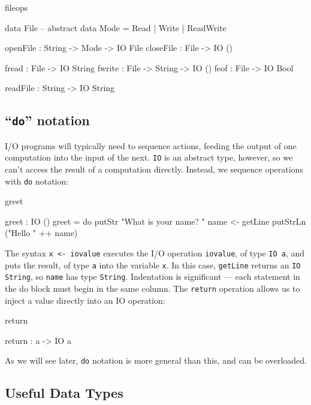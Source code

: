 \begin{SaveVerbatim}{fileops}

data File -- abstract
data Mode = Read | Write | ReadWrite

openFile  : String -> Mode -> IO File
closeFile : File -> IO ()

fread  : File -> IO String
fwrite : File -> String -> IO ()
feof   : File -> IO Bool

readFile : String -> IO String

\end{SaveVerbatim}

\subsection{``\texttt{do}'' notation}

\label{sect:do}

I/O programs will typically need to sequence actions, feeding the output of one
computation into the input of the next. \texttt{IO} is an abstract type, however, so we
can't access the result of a computation directly. Instead, we sequence
operations with \texttt{do} notation:

\begin{SaveVerbatim}{greet}

greet : IO ()
greet = do putStr "What is your name? "
           name <- getLine
           putStrLn ("Hello " ++ name)

\end{SaveVerbatim}

\noindent
The syntax \texttt{x <- iovalue} executes the I/O operation \texttt{iovalue}, of type 
\texttt{IO a}, and
puts the result, of type \texttt{a} into the variable \texttt{x}. 
In this case, \texttt{getLine} returns an \texttt{IO String},
so \texttt{name} has type \texttt{String}. Indentation is significant --- each
statement in the do block must begin in the same column.
The \texttt{return} operation allows us to inject a value directly into an IO
operation:

\begin{SaveVerbatim}{return}

return : a -> IO a

\end{SaveVerbatim}

\noindent
As we will see later, \texttt{do} notation is more general than this, and can be
overloaded.

\subsection{Useful Data Types}

